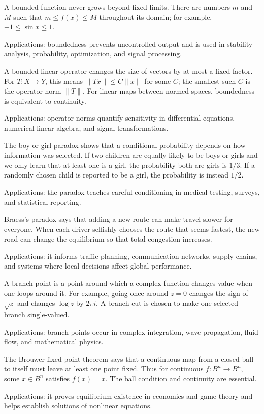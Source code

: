 A bounded function never grows beyond fixed limits. There are numbers $m$ and $M$ such that $m\le f(x)\le M$ throughout its domain; for example, $-1\le\sin x\le1$. \par\noindent Applications: boundedness prevents uncontrolled output and is used in stability analysis, probability, optimization, and signal processing.

A bounded linear operator changes the size of vectors by at most a fixed factor. For $T:X\to Y$, this means $\|Tx\|\le C\|x\|$ for some $C$; the smallest such $C$ is the operator norm $\|T\|$. For linear maps between normed spaces, boundedness is equivalent to continuity. \par\noindent Applications: operator norms quantify sensitivity in differential equations, numerical linear algebra, and signal transformations.

The boy-or-girl paradox shows that a conditional probability depends on how information was selected. If two children are equally likely to be boys or girls and we only learn that at least one is a girl, the probability both are girls is $1/3$. If a randomly chosen child is reported to be a girl, the probability is instead $1/2$. \par\noindent Applications: the paradox teaches careful conditioning in medical testing, surveys, and statistical reporting.

Braess's paradox says that adding a new route can make travel slower for everyone. When each driver selfishly chooses the route that seems fastest, the new road can change the equilibrium so that total congestion increases. \par\noindent Applications: it informs traffic planning, communication networks, supply chains, and systems where local decisions affect global performance.

A branch point is a point around which a complex function changes value when one loops around it. For example, going once around $z=0$ changes the sign of $\sqrt z$ and changes $\log z$ by $2\pi i$. A branch cut is chosen to make one selected branch single-valued. \par\noindent Applications: branch points occur in complex integration, wave propagation, fluid flow, and mathematical physics.

The Brouwer fixed-point theorem says that a continuous map from a closed ball to itself must leave at least one point fixed. Thus for continuous $f:B^n\to B^n$, some $x\in B^n$ satisfies $f(x)=x$. The ball condition and continuity are essential. \par\noindent Applications: it proves equilibrium existence in economics and game theory and helps establish solutions of nonlinear equations.

